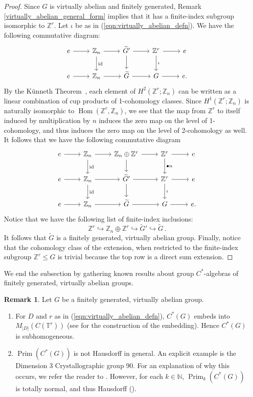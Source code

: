 \documentclass{amsart}
\theoremstyle{definition}
\newtheorem{remark}[theorem]{Remark}
\newcommand{\Z}{\mathbb{Z}}
\newcommand{\N}{\mathbb{N}}
\newcommand{\TT}{\mathbb{T}}
\DeclareMathOperator{\id}{id}
\DeclareMathOperator{\Hom}{Hom}
\DeclareMathOperator{\Prim}{Prim}
\begin{document}
\begin{proof}
Since $G$ is virtually abelian and finitely generated, Remark \ref{virtually_abelian_general_form} implies that it has a finite-index subgroup isomorphic to $\Z^r$. Let $\iota$ be as in (\ref{eqn:virtually_abelian_defn}). We have the following commutative diagram:
$$\begin{tikzcd}
e\arrow{r}&\Z_n\arrow{r}\arrow[d, "\id"]&\widetilde{G}'\arrow{r}\arrow{d}&\Z^r\arrow{r}\arrow[d,"\iota"]&e\\
e\arrow{r}&\Z_n\arrow{r}&\widetilde{G}\arrow{r}&G\arrow{r}&e.
\end{tikzcd}$$
By the K\"unneth Theorem~\cite[Theorem 3.16]{hatcher}, each element of $H^2(\Z^r;\Z_n)$ can be written as a linear combination of cup products of 1-cohomology classes. Since $H^1(\Z^r; \Z_n)$ is naturally isomorphic to $\Hom(\Z^r,\Z_n)$, we see that the map from $\Z^r$ to itself induced by multiplication by $n$ induces the zero map on the level of 1-cohomology, and thus induces the zero map on the level of 2-cohomology as well. It follows that we have the following commutative diagram
$$\begin{tikzcd}
e\arrow{r}&\Z_n\arrow{r}\arrow[d,"\id"]&\Z_n\oplus\Z^r\arrow{r}\arrow{d}&\Z^r\arrow{r}\arrow{d}{\bullet n}&e\\
e\arrow{r}&\Z_n\arrow{r}\arrow[d,"\id"]&\widetilde{G}'\arrow{r}\arrow{d}&\Z^r\arrow{r}\arrow[d,"\iota"]&e\\
e\arrow{r}&\Z_n\arrow{r}&\widetilde{G}\arrow{r}&G\arrow{r}&e.
\end{tikzcd}$$
Notice that we have the following list of finite-index inclusions:
$$\Z^r\hookrightarrow \Z_n\oplus\Z^r\hookrightarrow \widetilde{G}'\hookrightarrow \widetilde{G}\,.$$
It follows that $\widetilde{G}$ is a finitely generated, virtually abelian group. Finally, notice that the cohomology class of the extension, when restricted to the finite-index subgroup $\Z^r\leq G$ is trivial because the top row is a direct sum extension.
\end{proof}
We end the subsection by gathering known results about group $C^*$-algebras of finitely generated, virtually abelian groups.
\begin{remark}\label{remarks about C*-algebras of fg VA groups}
    Let $G$ be a finitely generated, virtually abelian group.
    \begin{enumerate}
        \item For $D$ and $r$ as in (\ref{eqn:virtually_abelian_defn}), $C^*(G)$ embeds into $M_{|D|}(C(\TT^r))$ (see \cite[Section 3.2]{Connective} for the construction of the embedding). Hence $C^*(G)$ is subhomogeneous.
        \item $\Prim(C^*(G))$ is not Hausdorff in general. An explicit example is the Dimension 3 Crystallographic group 90. For an explanation of why this occurs, we refer the reader to \cite[Proposition 4.5, Section 5 and Appendix]{CW24}. However, for each $k\in \N$, $\Prim_k(C^*(G))$ is totally normal, and thus Hausdorff (\cite[Proposition 4.10]{paper_untwisted_case}).
    \end{enumerate}
\end{remark}
\end{document}

